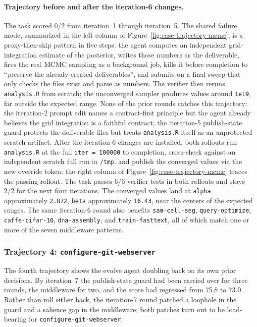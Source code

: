 \paragraph{Trajectory before and after the iteration-6 changes.}
The task scored 0/2 from iteration~1 through iteration~5. The shared failure mode, summarized in the left column of Figure~\ref{fig:case-trajectory-mcmc}, is a proxy-then-skip pattern in five steps: the agent computes an independent grid-integration estimate of the posterior, writes those numbers as the deliverable, fires the real MCMC sampling as a background job, kills it before completion to ``preserve the already-created deliverables'', and submits on a final sweep that only checks the files exist and parse as numbers. The verifier then reruns \texttt{analysis.R} from scratch; the unconverged sampler produces values around \texttt{1e19}, far outside the expected range. None of the prior rounds catches this trajectory: the iteration-2 prompt edit names a contract-first principle but the agent already believes the grid integration is a faithful contract; the iteration-5 publish-state guard protects the deliverable files but treats \texttt{analysis.R} itself as an unprotected scratch artifact. After the iteration-6 changes are installed, both rollouts run \texttt{analysis.R} at the full \texttt{iter = 100000} to completion, cross-check against an independent scratch full run in \texttt{/tmp}, and publish the converged values via the new override token; the right column of Figure~\ref{fig:case-trajectory-mcmc} traces the passing rollout. The task passes 6/6 verifier tests in both rollouts and stays 2/2 for the next four iterations. The converged values land at \texttt{alpha} approximately \texttt{2.872}, \texttt{beta} approximately \texttt{16.43}, near the centers of the expected ranges. The same iteration-6 round also benefits \texttt{sam-cell-seg}, \texttt{query-optimize}, \texttt{caffe-cifar-10}, \texttt{dna-assembly}, and \texttt{train-fasttext}, all of which match one or more of the seven middleware patterns.


\FloatBarrier

\subsubsection{Trajectory 4: \texttt{configure-git-webserver}}
\label{app:case-study:cgw}

The fourth trajectory shows the evolve agent doubling back on its own prior decisions. By iteration~7 the publish-state guard had been carried over for three rounds, the middleware for two, and the score had regressed from 75.8 to 73.0. Rather than roll either back, the iteration-7 round patched a loophole in the guard and a salience gap in the middleware; both patches turn out to be load-bearing for \texttt{configure-git-webserver}.

